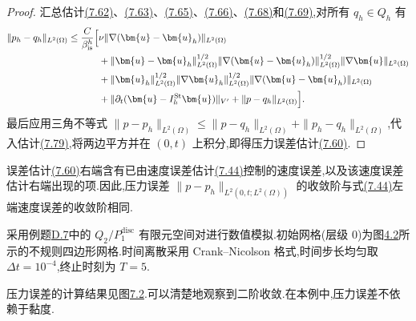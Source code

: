 \begin{proof}
汇总估计\hyperref[eq:time-dependent-pressure-error-viscous-bound]{(7.62)}、\hyperref[eq:time-dependent-pressure-error-pressure-bound]{(7.63)}、\hyperref[eq:time-dependent-pressure-error-convection-bound-1]{(7.65)}、\hyperref[eq:time-dependent-pressure-error-convection-bound-2]{(7.66)}、\hyperref[eq:time-dependent-pressure-error-time-derivative-projection]{(7.68)}和\hyperref[eq:time-dependent-pressure-error-time-derivative-discrete]{(7.69)},对所有 $q_h\in Q_h$ 有
\begin{equation}\label{eq:time-dependent-pressure-error-pointwise}
\begin{aligned}
  \|p_h-q_h\|_{L^2(\Omega)}
  \le \frac{C}{\beta_{\mathrm{is}}^h}\Bigl[{}
       &\nu\|\nabla(\bm{u}-\bm{u}_h)\|_{L^2(\Omega)}\\
       &+\|\bm{u}-\bm{u}_h\|_{L^2(\Omega)}^{1/2}
        \|\nabla(\bm{u}-\bm{u}_h)\|_{L^2(\Omega)}^{1/2}
        \|\nabla\bm{u}\|_{L^2(\Omega)}\\
       &+\|\bm{u}_h\|_{L^2(\Omega)}^{1/2}
        \|\nabla\bm{u}_h\|_{L^2(\Omega)}^{1/2}
        \|\nabla(\bm{u}-\bm{u}_h)\|_{L^2(\Omega)}\\
       &+\|\partial_t(\bm{u}-I_h^{\mathrm{St}}\bm{u})\|_{V'}
        +\|p-q_h\|_{L^2(\Omega)}\Bigr].
\end{aligned}
\end{equation}
最后应用三角不等式
$\|p-p_h\|_{L^2(\Omega)}\le\|p-q_h\|_{L^2(\Omega)}+\|p_h-q_h\|_{L^2(\Omega)}$,代入估计\hyperref[eq:time-dependent-pressure-error-pointwise]{(7.79)},将两边平方并在 $(0,t)$ 上积分,即得压力误差估计\hyperref[eq:time-dependent-fem-pressure-error]{(7.60)}.
\end{proof}

\begin{note}[关于误差估计(7.60)]
\label{note:time-dependent-fem-pressure-error-interpretation}
误差估计\hyperref[eq:time-dependent-fem-pressure-error]{(7.60)}右端含有已由速度误差估计\hyperref[eq:time-dependent-fem-velocity-error]{(7.44)}控制的速度误差,以及该速度误差估计右端出现的项.因此,压力误差 $\|p-p_h\|_{L^2(0,t;L^2(\Omega))}$ 的收敛阶与式\hyperref[eq:time-dependent-fem-velocity-error]{(7.44)}左端速度误差的收敛阶相同.
\end{note}

\begin{example}
\label{ex:time-dependent-pressure-error}
采用例题\hyperref[ex:appendix-d-7]{D.7}中的 $Q_2/P_1^{\mathrm{disc}}$ 有限元空间对进行数值模拟.初始网格(层级 0)为图\hyperref[fig:stokes-example-initial-grids]{4.2}所示的不规则四边形网格.时间离散采用 Crank--Nicolson 格式,时间步长均匀取 $\Delta t=10^{-4}$,终止时刻为 $T=5$.

压力误差的计算结果见图\hyperref[fig:time-dependent-pressure-error-convergence]{7.2}.可以清楚地观察到二阶收敛.在本例中,压力误差不依赖于黏度.
\end{example}

